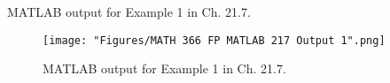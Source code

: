 \newpage
MATLAB output for Example 1 in Ch. 21.7.
\begin{figure}[htbp]
\begin{center}
\texttt{[image: "Figures/MATH 366 FP MATLAB 217 Output 1".png]}
\caption*{MATLAB output for Example 1 in Ch. 21.7.}
\end{center}
\end{figure}

